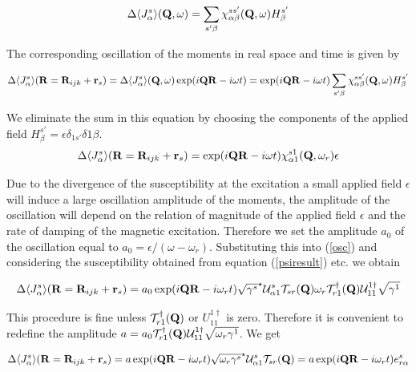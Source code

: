 \begin{equation}
\Delta \langle J^s_{\alpha}\rangle(\mathbf Q,\omega)=\sum_{s'\beta}\chi^{ss'}_{\alpha\beta}(\mathbf Q,\omega) H^{s'}_{\beta}
\end{equation} 

The corresponding oscillation of the moments in real space and time is given by 

\begin{equation}
\Delta \langle J^s_{\alpha}\rangle(\mathbf R=\mathbf R_{ijk}+\mathbf r_s)=
\Delta \langle J^s_{\alpha}\rangle(\mathbf Q,\omega)\exp(i\mathbf Q \mathbf R-i\omega t)=
\exp(i\mathbf Q \mathbf R-i\omega t) \sum_{s'\beta}\chi^{ss'}_{\alpha\beta}(\mathbf Q,\omega) H^{s'}_{\beta}
\end{equation} 

We eliminate the sum in this equation by choosing the components of the applied field $H^{s'}_{\beta}=\epsilon %
\delta_{1s'}\delta{1\beta}$.
\begin{equation}\label{osc}
\Delta \langle J^s_{\alpha}\rangle(\mathbf R=\mathbf R_{ijk}+\mathbf r_s)=
\exp(i\mathbf Q \mathbf R-i\omega t) \chi^{s1}_{\alpha1}(\mathbf Q,\omega_r) \epsilon 
\end{equation} 

Due to the divergence of the susceptibility at the excitation  a small
applied field $\epsilon$ will induce a large oscillation amplitude of the moments, the amplitude
of the oscillation will depend on the relation of magnitude of the applied field $\epsilon$ and
the rate of damping of the magnetic excitation. Therefore we set the amplitude $a_0$ of the 
oscillation equal to $a_0=\epsilon / (\omega-\omega_r)$. Substituting this into (\ref{osc}) and
considering the susceptibility obtained from equation (\ref{psiresult}) etc. we obtain

\begin{equation}\label{oscill}
\Delta \langle J^s_{\alpha}\rangle(\mbf R=\mbf R_{ijk}+\mbf r_s)=
a_0 \exp(i\mbf Q \mbf R-i\omega_r t) 
\sqrt{\gamma^s}^\star \mathcal U^s_{\alpha1} \mathcal T_{sr}(\mbf Q) \omega_r \mathcal T^{\dag}_{r1}(\mbf Q) \mathcal %
U^{1\dag}_{11}\sqrt{\gamma^{1}}
\end{equation} 

This procedure is fine unless $\mathcal T^{\dag}_{r1}(\mathbf Q)$ or $U^{1\dag}_{11}$ is zero. Therefore
it is convenient to redefine the amplitude $a=a_0 \mathcal T^{\dag}_{r1}(\mbf Q) \mathcal %
U^{1\dag}_{11}\sqrt{\omega_r\gamma^{1}}$.
We get

\begin{equation}\label{oscillation}
\Delta \langle J^s_{\alpha}\rangle(\mathbf R=\mathbf R_{ijk}+\mathbf r_s)=
a \exp(i\mathbf Q \mathbf R-i\omega_r t) 
\sqrt{\omega_r\gamma^s}^\star \mathcal U^s_{\alpha1} \mathcal T_{sr}(\mathbf Q)=
a \exp(i\mathbf Q \mathbf R-i\omega_r t) e^s_{r\alpha} 
\end{equation} 

